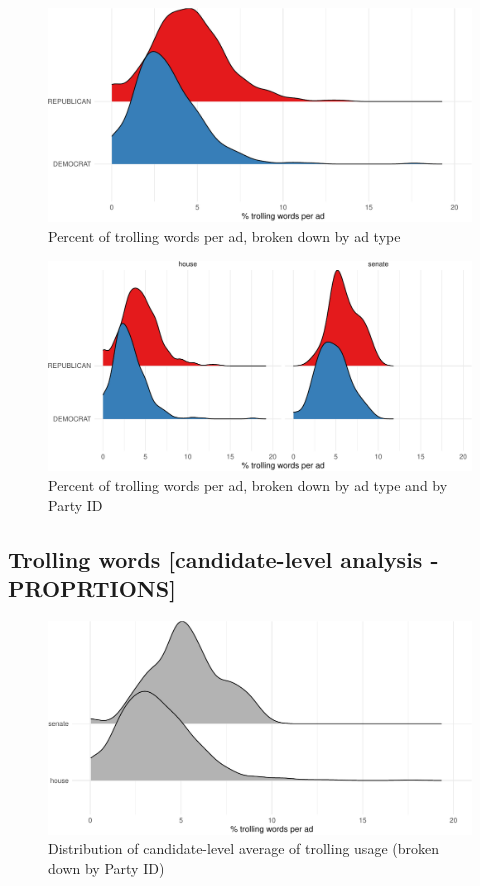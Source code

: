 \documentclass[
  12pt,
]{article}
\begin{document}
\begin{figure}
\centering
\includegraphics{figsFB/unnamed-chunk-12-1.pdf}
\caption{\label{fig:unnamed-chunk-12}Percent of trolling words per ad, broken down by ad type}
\end{figure}

\begin{figure}
\centering
\includegraphics{figsFB/unnamed-chunk-13-1.pdf}
\caption{\label{fig:unnamed-chunk-13}Percent of trolling words per ad, broken down by ad type and by Party ID}
\end{figure}

\pagebreak
\clearpage

\hypertarget{trolling-words-candidate-level-analysis---proprtions}{%
\subsection{Trolling words {[}candidate-level analysis - PROPRTIONS{]}}\label{trolling-words-candidate-level-analysis---proprtions}}

\begin{figure}
\centering
\includegraphics{figsFB/unnamed-chunk-14-1.pdf}
\caption{\label{fig:unnamed-chunk-14}Distribution of candidate-level average of trolling usage (broken down by Party ID)}
\end{figure}
\end{document}
